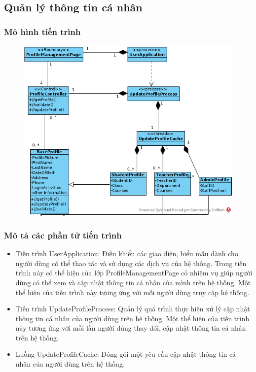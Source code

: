 \documentclass[./../main_file.tex]{subfiles}
\begin{document}
\subsection{Quản lý thông tin cá nhân}

\subsubsection{Mô hình tiến trình}

\begin{figure}[H]
	\centering
	\includegraphics[width=\linewidth]{./images/pv_ProfileManagement.png}
\end{figure}

\subsubsection{Mô tả các phần tử tiến trình}
\begin{itemize}
	\item Tiến trình UserApplication: Điều khiển các giao diện, biểu mẫu dành cho người dùng có thể thao tác và sử dụng các dịch vụ của hệ thống. Trong tiến trình này có  thể hiện của lớp ProfileManagementPage có nhiệm vụ giúp người dùng có thể xem và cập nhật thông tin cá nhân của mình trên hệ thống.
	      Một thể hiện của tiến trình này tương ứng với mỗi người dùng truy cập hệ thống.
	\item Tiến trình UpdateProfileProcess: Quản lý quá trình thực hiện xử lý cập nhật thông tin cá nhân của người dùng trên hệ thống.
	      Một thể hiện của tiến trình này tương ứng với mỗi lần người dùng thay đổi, cập nhật thông tin cá nhân trên hệ thống.
	\item Luồng UpdateProfileCache: Đóng gói một yêu cầu cập nhật thông tin cá nhân của người dùng trên hệ thống.
\end{itemize}
\end{document}
